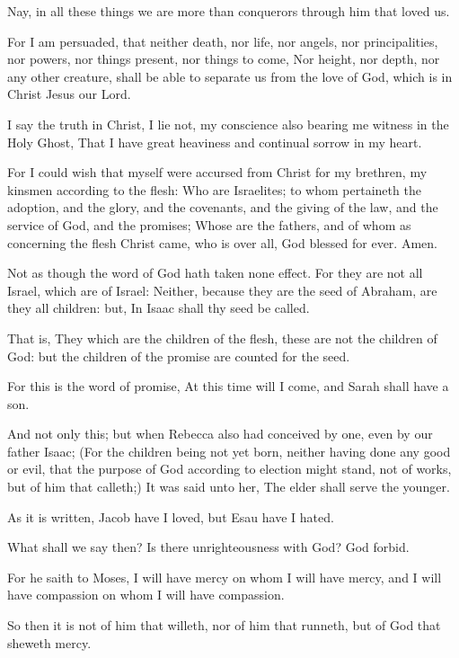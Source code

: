 \Verse Nay, in all these things we are more than conquerors through him that loved us.

\Verse For I am persuaded, that neither death, nor life, nor angels, nor principalities, nor powers, nor things present, nor things to come, \Verse Nor height, nor depth, nor any other creature, shall be able to separate us from the love of God, which is in Christ Jesus our Lord.


\Chapter
\Verse I say the truth in Christ, I lie not, my conscience also bearing me witness in the Holy Ghost, \Verse That I have great heaviness and continual sorrow in my heart.

\Verse For I could wish that myself were accursed from Christ for my brethren, my kinsmen according to the flesh: \Verse Who are Israelites; to whom pertaineth the adoption, and the glory, and the covenants, and the giving of the law, and the service of God, and the promises; \Verse Whose are the fathers, and of whom as concerning the flesh Christ came, who is over all, God blessed for ever. Amen.

\Verse Not as though the word of God hath taken none effect. For they are not all Israel, which are of Israel: \Verse Neither, because they are the seed of Abraham, are they all children: but, In Isaac shall thy seed be called.

\Verse That is, They which are the children of the flesh, these are not the children of God: but the children of the promise are counted for the seed.

\Verse For this is the word of promise, At this time will I come, and Sarah shall have a son.

\Verse And not only this; but when Rebecca also had conceived by one, even by our father Isaac; \Verse (For the children being not yet born, neither having done any good or evil, that the purpose of God according to election might stand, not of works, but of him that calleth;) \Verse It was said unto her, The elder shall serve the younger.

\Verse As it is written, Jacob have I loved, but Esau have I hated.

\Verse What shall we say then? Is there unrighteousness with God? God forbid.

\Verse For he saith to Moses, I will have mercy on whom I will have mercy, and I will have compassion on whom I will have compassion.

\Verse So then it is not of him that willeth, nor of him that runneth, but of God that sheweth mercy.

